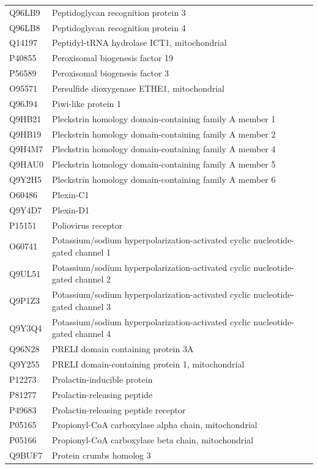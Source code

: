 \documentclass[10pt,twoside]{article}
\begin{document}
\begin{longtable}{lL{0.75\textwidth}}
Q96LB9	&	Peptidoglycan recognition protein 3 	\\
Q96LB8	&	Peptidoglycan recognition protein 4 	\\
Q14197	&	Peptidyl-tRNA hydrolase ICT1, mitochondrial 	\\
P40855	&	Peroxisomal biogenesis factor 19 	\\
P56589	&	Peroxisomal biogenesis factor 3 	\\
O95571	&	Persulfide dioxygenase ETHE1, mitochondrial 	\\
Q96J94	&	Piwi-like protein 1 	\\
Q9HB21	&	Pleckstrin homology domain-containing family A member 1 	\\
Q9HB19	&	Pleckstrin homology domain-containing family A member 2 	\\
Q9H4M7	&	Pleckstrin homology domain-containing family A member 4 	\\
Q9HAU0	&	Pleckstrin homology domain-containing family A member 5 	\\
Q9Y2H5	&	Pleckstrin homology domain-containing family A member 6 	\\
O60486	&	Plexin-C1 	\\
Q9Y4D7	&	Plexin-D1	\\
P15151	&	Poliovirus receptor 	\\
O60741	&	Potassium/sodium hyperpolarization-activated cyclic nucleotide-gated channel 1 	\\
Q9UL51	&	Potassium/sodium hyperpolarization-activated cyclic nucleotide-gated channel 2 	\\
Q9P1Z3	&	Potassium/sodium hyperpolarization-activated cyclic nucleotide-gated channel 3	\\
Q9Y3Q4	&	Potassium/sodium hyperpolarization-activated cyclic nucleotide-gated channel 4	\\
Q96N28	&	PRELI domain containing protein 3A 	\\
Q9Y255	&	PRELI domain-containing protein 1, mitochondrial 	\\
P12273	&	Prolactin-inducible protein 	\\
P81277	&	Prolactin-releasing peptide 	\\
P49683	&	Prolactin-releasing peptide receptor 	\\
P05165	&	Propionyl-CoA carboxylase alpha chain, mitochondrial 	\\
P05166	&	Propionyl-CoA carboxylase beta chain, mitochondrial 	\\
Q9BUF7	&	Protein crumbs homolog 3	\\

\end{longtable}
\end{document}
